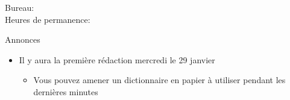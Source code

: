 \documentclass{beamer}
\subtitle[Vie professionnelle]{La vie professionnelle}
\begin{document}
  \begin{frame}
    \titlepage
    \tiny{Bureau: \\
          Heures de permanence: }
  \end{frame}

  \begin{frame}{Annonces}
    \begin{itemize}
      \item Il y aura la première rédaction mercredi le 29 janvier
      \begin{itemize}
        \item Vous pouvez amener \alert{un dictionnaire en papier} à utiliser pendant les dernières minutes
      \end{itemize}
    \end{itemize}
  \end{frame}

\end{document}
